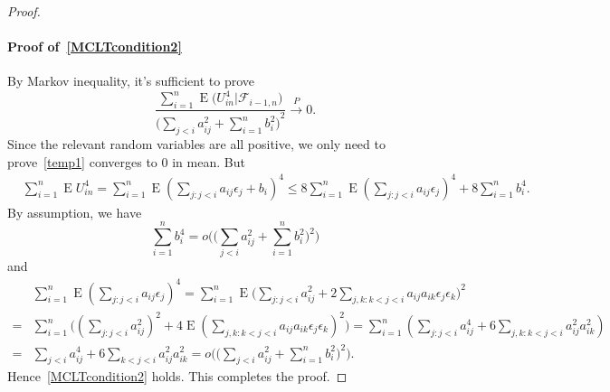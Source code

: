 \documentclass[3p]{elsarticle}
\DeclareMathOperator{\myE}{E}
\theoremstyle{plain}
\theoremstyle{definition}
\theoremstyle{remark}
\begin{document}
\begin{proof}
     \paragraph{Proof of~\eqref{MCLTcondition2}}
     By Markov inequality, it's sufficient to prove
     \begin{equation}\label{temp1}
         \frac{\sum_{i=1}^n \myE\big(U_{in}^4\big|\mathcal{F}_{i-1,n}\big)}{{\big(\sum_{j<i} a_{ij}^2+\sum_{i=1}^n b_i^2\big)}^2}\xrightarrow{P} 0.
     \end{equation}
     Since the relevant random variables are all positive, we only need to prove~\eqref{temp1} converges to $0$ in mean. But
     \begin{equation*}
         \begin{aligned}
             &\sum_{i=1}^n \myE U_{in}^4
             =
             \sum_{i=1}^n \myE (\sum_{j:j<i}a_{ij}\epsilon_j+b_i)^4
             \leq
             8\sum_{i=1}^n \myE (\sum_{j:j<i}a_{ij}\epsilon_j)^4
             +8\sum_{i=1}^n b_i^4.
         \end{aligned}
     \end{equation*}
     By assumption, we have
     $$
     \sum_{i=1}^n b_i^4=
             o\Big(\big(\sum_{j<i} a_{ij}^2 +\sum_{i=1}^n b_i^2\big)^2\Big)
     $$
     and
     \begin{equation*}
         \begin{aligned}
             &\sum_{i=1}^n \myE (\sum_{j:j<i}a_{ij}\epsilon_j)^4=
             \sum_{i=1}^n \myE \big(\sum_{j:j<i}a_{ij}^2+2\sum_{j,k:k<j<i}a_{ij}a_{ik}\epsilon_j \epsilon_k \big)^2\\
             =&
             \sum_{i=1}^n  \big((\sum_{j:j<i}a_{ij}^2)^2+4\myE(\sum_{j,k:k<j<i}a_{ij}a_{ik}\epsilon_j \epsilon_k)^2 \big)
             =
             \sum_{i=1}^n  (\sum_{j:j<i}a_{ij}^4+6\sum_{j,k:k<j<i}a_{ij}^2 a_{ik}^2)\\
             =&
             \sum_{j<i}a_{ij}^4+6\sum_{k<j<i}a_{ij}^2 a_{ik}^2
             =
             o\Big(\big(\sum_{j<i} a_{ij}^2 +\sum_{i=1}^n b_i^2\big)^2\Big).
         \end{aligned}
     \end{equation*}
      Hence~\eqref{MCLTcondition2} holds.
      This completes the proof.
 \end{proof}
\end{document}
